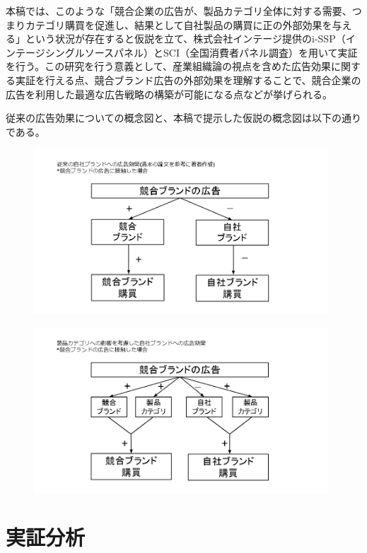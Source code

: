 \documentclass[11pt]{jsarticle}
\begin{document}
本稿では、このような「競合企業の広告が、製品カテゴリ全体に対する需要、つまりカテゴリ購買を促進し、結果として自社製品の購買に正の外部効果を与える」という状況が存在すると仮説を立て、株式会社インテージ提供のi-SSP（インテージシングルソースパネル）とSCI（全国消費者パネル調査）を用いて実証を行う。この研究を行う意義として、産業組織論の視点を含めた広告効果に関する実証を行える点、競合ブランド広告の外部効果を理解することで、競合企業の広告を利用した最適な広告戦略の構築が可能になる点などが挙げられる。

従来の広告効果についての概念図と、本稿で提示した仮説の概念図は以下の通りである。


\begin{figure}[htbp]
 \centering
 \includegraphics[width=11cm]{./fig/2_ad_before.png}
 \label{fig:ad_before}
\end{figure}

\begin{figure}[htbp]
 \centering
 \includegraphics[width=11cm]{./fig/2_ad_after.png}
 \label{fig:ad_after}
\end{figure}


\section{実証分析}
\label{ch:empirical_analysis}
\end{document}
